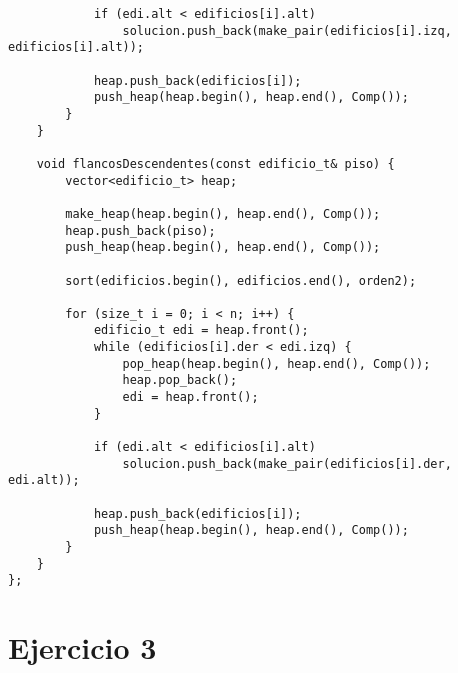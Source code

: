 \begin{frame}
\begin{lstlisting}
			if (edi.alt < edificios[i].alt)
				solucion.push_back(make_pair(edificios[i].izq, edificios[i].alt));

			heap.push_back(edificios[i]);
			push_heap(heap.begin(), heap.end(), Comp());
		}
	}

	void flancosDescendentes(const edificio_t& piso) {
		vector<edificio_t> heap;

		make_heap(heap.begin(), heap.end(), Comp());
		heap.push_back(piso);
		push_heap(heap.begin(), heap.end(), Comp());

		sort(edificios.begin(), edificios.end(), orden2);

		for (size_t i = 0; i < n; i++) {
			edificio_t edi = heap.front();
			while (edificios[i].der < edi.izq) {
				pop_heap(heap.begin(), heap.end(), Comp());
				heap.pop_back();
				edi = heap.front();
			}

			if (edi.alt < edificios[i].alt)
				solucion.push_back(make_pair(edificios[i].der, edi.alt));

			heap.push_back(edificios[i]);
			push_heap(heap.begin(), heap.end(), Comp());
		}
	}
};
\end{lstlisting}
\end{frame}

\newpage
\section{Ejercicio 3} \label{App:AppendixC}

